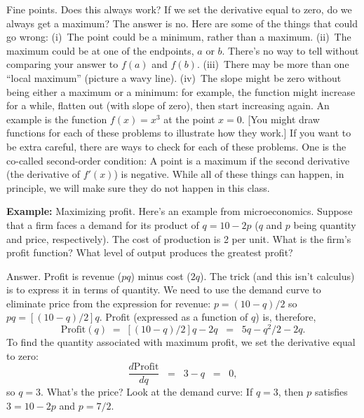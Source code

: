 Fine points.  Does this always work?
If we set the derivative equal to zero, do we always get a maximum?  The answer is no.
Here are some of the things that could go wrong:
(i)~The point could be a minimum, rather than a maximum.
(ii)~The maximum could be at one of the endpoints, $a$ or $b$.
There's no way to tell without comparing your answer to $f(a)$ and
$f(b)$. (iii)~There may be more than one ``local maximum'' (picture
a wavy line). (iv)~The slope might be zero without being either a
maximum or a minimum: for example, the function might increase for
a while, flatten out (with slope of zero), then start increasing
again. An example is the function $f(x) = x^3$ at the point $x=0$.
[You might draw functions for each of these problems to illustrate
how they work.]
If you want to be extra careful, there are ways to check for each of these problems.
One is the co-called second-order condition:  A point is a maximum if the second derivative
(the derivative of $f'(x)$) is negative.
While all of these things can happen, in principle,
we will make sure they do not happen in this class.


\textbf{Example:}  Maximizing profit.
Here's an example from microeconomics.
Suppose that a firm faces a demand for its product of $q = 10 - 2p$
($q$ and $p$ being quantity and price, respectively).
The cost of production is 2 per unit.
What is the firm's profit function?
What level of output produces the greatest profit?

Answer.  Profit is revenue ($pq$) minus cost ($2q$). The trick
(and this isn't calculus) is to express it in terms of quantity.
We need to use the demand curve to eliminate price from
the expression for revenue: $p = (10-q)/2$ so $pq = [(10-q)/2]q$.
Profit (expressed as a function of $q$) is, therefore,
\[
    \mbox{Profit}(q) \;=\; [(10-q)/2]q - 2q \;\;=\;\; 5q - q^2/2 - 2q.
\]
To find the quantity associated with maximum profit, we set the derivative equal to zero:
\[
    \frac{d\mbox{Profit}}{dq} \;\;=\;\; 3 - q \;\;=\;\; 0,
\]
so $q = 3$.  What's the price?
Look at the demand curve:  If $q = 3$, then $p$ satisfies $3 = 10-2p$ and $p = 7/2$.

